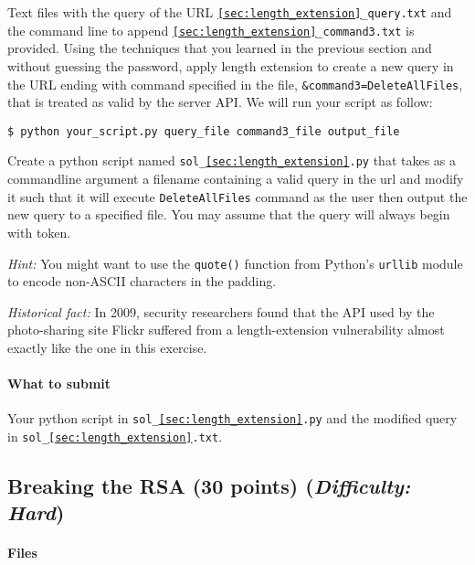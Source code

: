 \documentclass[letterpaper,12pt]{report}
\begin{document}
\medskip
 
Text files with the query of the URL {\tt \ref{sec:length_extension}\_query.txt} and the command line to append \texttt{\ref{sec:length_extension}\_command3.txt} is provided. Using the techniques that you learned in the previous section and without guessing the password, apply length extension to create a new query in the URL ending with command specified in the file, \texttt{\&command3=DeleteAllFiles}, that is treated as valid by the server API. We will run your script as follow:
\begin{mdframed}
\begin{verbatim}
$ python your_script.py query_file command3_file output_file
\end{verbatim}
\end{mdframed}

\medskip

Create a python script named \texttt{sol\_\ref{sec:length_extension}.py} that takes as a commandline argument a filename containing a valid query in the url and modify it such that it will execute \texttt{DeleteAllFiles} command as the user then output the new query to a specified file.  You may assume that the query will always begin with token.

\medskip

\emph{Hint:} You might want to use the \texttt{quote()} function from Python's \texttt{urllib} module to encode non-ASCII characters in the padding.

\medskip

\emph{Historical fact:} In 2009, security researchers found that the API used by the photo-sharing site Flickr  suffered from a length-extension vulnerability almost exactly like the one in this exercise.

\paragraph{What to submit}

Your python script in \texttt{sol\_\ref{sec:length_extension}.py} and the modified query in \texttt{sol\_\ref{sec:length_extension}.txt}. 

 \subsection{Breaking the RSA (30 points)  \hfill\rm\normalsize (\emph{Difficulty: Hard})}
 \label{sec:breaking_rsa}
 \paragraph{Files}
\end{document}
